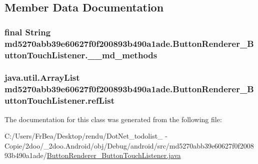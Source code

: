 \subsection{Member Data Documentation}
\hypertarget{classmd5270abb39e60627f0f200893b490a1ade_1_1_button_renderer___button_touch_listener_ea3b2556e7fa58d1abea18bfdd03b8c5}{
\subsubsection[{\_\-\_\-md\_\-methods}]{\setlength{\rightskip}{0pt plus 5cm}final String {\bf md5270abb39e60627f0f200893b490a1ade.ButtonRenderer\_\-ButtonTouchListener.\_\-\_\-md\_\-methods}}}
\label{classmd5270abb39e60627f0f200893b490a1ade_1_1_button_renderer___button_touch_listener_ea3b2556e7fa58d1abea18bfdd03b8c5}


\hypertarget{classmd5270abb39e60627f0f200893b490a1ade_1_1_button_renderer___button_touch_listener_f5f607b9a9d4a05bc95dc8d268c17216}{
\subsubsection[{refList}]{\setlength{\rightskip}{0pt plus 5cm}java.util.ArrayList {\bf md5270abb39e60627f0f200893b490a1ade.ButtonRenderer\_\-ButtonTouchListener.refList}}}
\label{classmd5270abb39e60627f0f200893b490a1ade_1_1_button_renderer___button_touch_listener_f5f607b9a9d4a05bc95dc8d268c17216}




The documentation for this class was generated from the following file:\begin{CompactItemize}
\item 
C:/Users/FrBea/Desktop/rendu/DotNet\_\-todolist\_ - Copie/2doo/\_\-2doo.Android/obj/Debug/android/src/md5270abb39e60627f0f200893b490a1ade/\hyperlink{md5270abb39e60627f0f200893b490a1ade_2_button_renderer___button_touch_listener_8java}{ButtonRenderer\_\-ButtonTouchListener.java}\end{CompactItemize}
